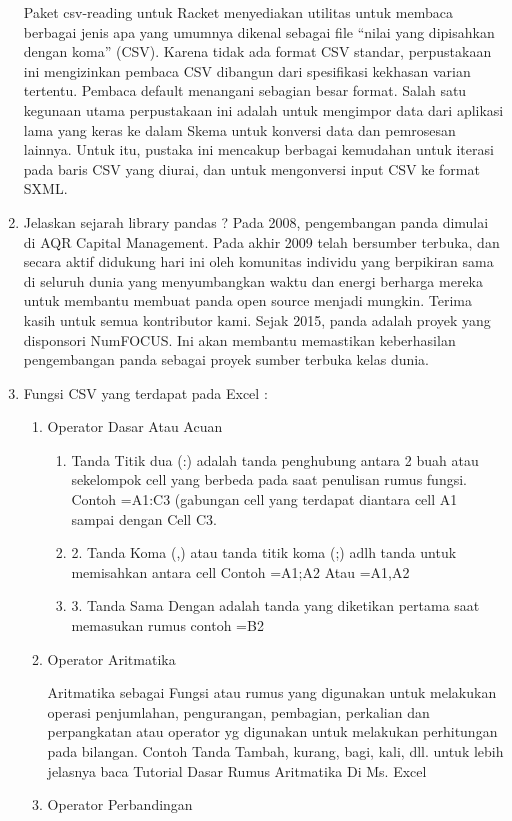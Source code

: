 \begin{enumerate}
Paket csv-reading untuk Racket menyediakan utilitas untuk membaca berbagai jenis apa yang umumnya dikenal sebagai file “nilai yang dipisahkan dengan koma” (CSV). Karena tidak ada format CSV standar, perpustakaan ini mengizinkan pembaca CSV dibangun dari spesifikasi kekhasan varian tertentu. Pembaca default menangani sebagian besar format.
Salah satu kegunaan utama perpustakaan ini adalah untuk mengimpor data dari aplikasi lama yang keras ke dalam Skema untuk konversi data dan pemrosesan lainnya. Untuk itu, pustaka ini mencakup berbagai kemudahan untuk iterasi pada baris CSV yang diurai, dan untuk mengonversi input CSV ke format SXML.

\item Jelaskan sejarah library pandas ?
Pada 2008, pengembangan panda dimulai di AQR Capital Management. Pada akhir 2009 telah bersumber terbuka, dan secara aktif didukung hari ini oleh komunitas individu yang berpikiran sama di seluruh dunia yang menyumbangkan waktu dan energi berharga mereka untuk membantu membuat panda open source menjadi mungkin. Terima kasih untuk semua kontributor kami.
Sejak 2015, panda adalah proyek yang disponsori NumFOCUS. Ini akan membantu memastikan keberhasilan pengembangan panda sebagai proyek sumber terbuka kelas dunia.
\item Fungsi CSV yang terdapat pada Excel : 

\begin{enumerate}
\item Operator Dasar Atau Acuan
\begin{enumerate}
\item Tanda Titik dua (:) adalah tanda penghubung antara 2 buah atau sekelompok cell yang berbeda pada saat penulisan rumus fungsi. Contoh =A1:C3 (gabungan cell yang terdapat diantara cell A1 sampai dengan Cell C3.
\item 2.	Tanda Koma (,) atau tanda titik koma (;) adlh tanda untuk memisahkan antara cell Contoh =A1;A2 Atau =A1,A2
\item 3.	Tanda Sama Dengan adalah tanda yang diketikan pertama saat memasukan rumus contoh =B2
\end{enumerate}

\item Operator Aritmatika

Aritmatika sebagai Fungsi atau rumus yang digunakan untuk melakukan operasi penjumlahan, pengurangan, pembagian, perkalian dan perpangkatan atau operator yg digunakan untuk melakukan perhitungan pada bilangan. Contoh Tanda Tambah, kurang, bagi, kali, dll. untuk lebih jelasnya baca Tutorial Dasar Rumus Aritmatika Di Ms. Excel
\item Operator Perbandingan


\end{enumerate}
\end{enumerate}
